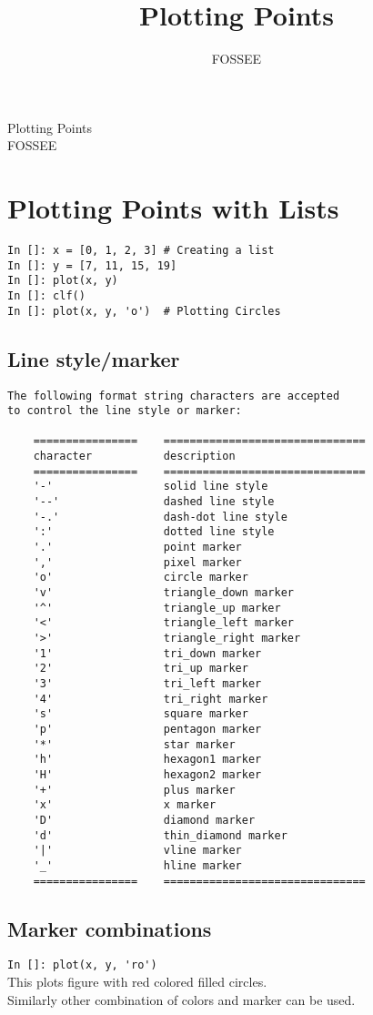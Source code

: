 \documentclass[12pt]{article}
\title{Plotting Points}
\author{FOSSEE}
\newcommand{\typ}[1]{\lstinline{#1}}
\begin{document}
\date{}
\vspace{-1in}
\begin{center}
\LARGE{Plotting Points}\\
\large{FOSSEE}
\end{center}

\section{Plotting Points with Lists}

\begin{lstlisting}
In []: x = [0, 1, 2, 3] # Creating a list
In []: y = [7, 11, 15, 19]
In []: plot(x, y)
In []: clf()
In []: plot(x, y, 'o')  # Plotting Circles
\end{lstlisting}

\subsection{Line style/marker}
\begin{lstlisting}
The following format string characters are accepted 
to control the line style or marker:
    
    ================    ===============================
    character           description
    ================    ===============================
    '-'                 solid line style
    '--'                dashed line style
    '-.'                dash-dot line style
    ':'                 dotted line style
    '.'                 point marker
    ','                 pixel marker
    'o'                 circle marker
    'v'                 triangle_down marker
    '^'                 triangle_up marker
    '<'                 triangle_left marker
    '>'                 triangle_right marker
    '1'                 tri_down marker
    '2'                 tri_up marker
    '3'                 tri_left marker
    '4'                 tri_right marker
    's'                 square marker
    'p'                 pentagon marker
    '*'                 star marker
    'h'                 hexagon1 marker
    'H'                 hexagon2 marker
    '+'                 plus marker
    'x'                 x marker
    'D'                 diamond marker
    'd'                 thin_diamond marker
    '|'                 vline marker
    '_'                 hline marker
    ================    ===============================

\end{lstlisting}

\subsection{Marker combinations}
\typ{In []: plot(x, y, 'ro')} \\
This plots figure with red colored filled circles.\\
Similarly other combination of colors and marker can be used.
\end{document}
